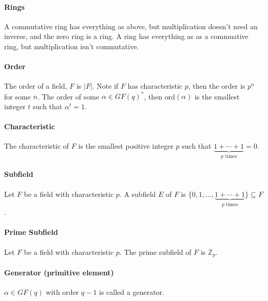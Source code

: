\documentclass[10pt,letter]{article}
\theoremstyle{plain}
\theoremstyle{definition}
\begin{document}
\paragraph{Rings}
A commutative ring has everything as above, but multiplication doesn't need an inverse, and the zero ring is a ring. A ring has everything as as a commuative ring, but multiplication isn't commutative.
\paragraph{Order} The order of a field, $F$ is $|F|$. Note if $F$ has characteristic $p$, then the order is $p^n$ for some $n$. The order of some $\alpha\in GF(q)^*$, then ord$(\alpha)$ is the smallest integer $t$ such that $\alpha^t=1$. 
\paragraph{Characteristic} The characteristic of $F$ is the smallest positive integer $p$ such that $\underbrace{1+\cdots+1}_{p\text{ times}}=0$. 
\paragraph{Subfield} Let $F$ be a field with characteristic $p$. A subfield $E$ of $F$ is $\{0,1,\ldots,\underbrace{1+\cdots+1}_{p\text{ times}}\}\subseteq F$. 
\paragraph{Prime Subfield} Let $F$ be a field with characteristic $p$. The prime subfield of $F$ is $\mathbb{Z}_p$. 
\paragraph{Generator (primitive element)} $\alpha\in GF(q)$ with order $q-1$ is called a generator. 
\end{document}
